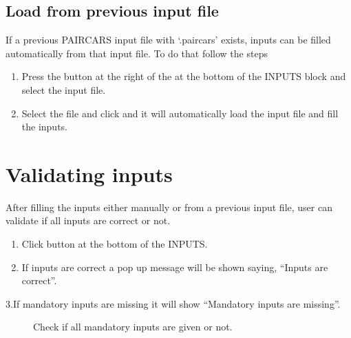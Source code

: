 \documentclass[letterpaper,10pt,english]{sphinxmanual}
\begin{document}
\subsection{Load from previous input file}
\label{\detokenize{tut:load-from-previous-input-file}}
\sphinxAtStartPar
If a previous P\sphinxhyphen{}AIRCARS input file with ‘.paircars’ exists, inputs can be filled automatically from that input file. To do that follow the steps
\begin{enumerate}
%
\item {} 
\sphinxAtStartPar
Press the  button at the right of the  at the bottom of the INPUTS block and select the input file.

\item {} 
\sphinxAtStartPar
Select the file and click  and it will automatically load the input file and fill the inputs.

\end{enumerate}


\section{Validating inputs}
\label{\detokenize{tut:validating-inputs}}
\sphinxAtStartPar
After filling the inputs either manually or from a previous input file, user can validate if all inputs are correct or not.
\begin{enumerate}
%
\item {} 
\sphinxAtStartPar
Click  button at the bottom of the INPUTS.

\item {} 
\sphinxAtStartPar
If inputs are correct a pop up message will be shown saying, “Inputs are correct”.

\end{enumerate}
\begin{description}
\item[{3.If mandatory inputs are missing it will show “Mandatory inputs are missing”.}] \leavevmode
\sphinxAtStartPar
Check if all mandatory inputs are given or not.

\end{description}
\end{document}
